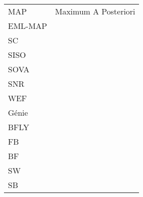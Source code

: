 \begin{center}
\begin{longtable}{ p{}  p{} }
MAP         & Maximum A Posteriori 									\\
EML-MAP     &														\\
SC          &														\\
SISO        &														\\
SOVA		&														\\
SNR			&														\\
WEF         &														\\
Génie 		&														\\
BFLY		&														\\
FB		&														\\
BF		&														\\
SW		&														\\
SB		&														\\

\end{longtable}

\end{center}

